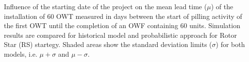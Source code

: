 \label{fig:comparison}
Influence of the starting date of the project on the mean lead time ($\mu$) of the installation of 60 OWT measured in days between the start of pilling activity of the first OWT until the completion of an OWF containing 60 units. Simulation results are compared for historical model and probabilistic approach for Rotor Star (RS) startegy. Shaded areas show the standard deviation limits ($\sigma$) for both models, i.e. $\mu + \sigma$ and $\mu - \sigma$.